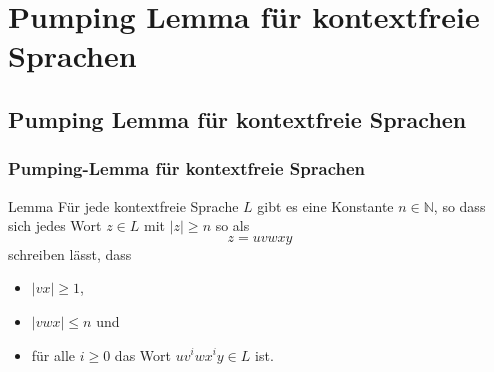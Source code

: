 \section{Pumping Lemma für kontextfreie Sprachen}
\subsection{Pumping Lemma für kontextfreie Sprachen}
\begin{frame}
	\frametitle{Pumping-Lemma für kontextfreie Sprachen}
	\begin{exampleblock}{Lemma}
		Für jede kontextfreie Sprache $L$ gibt es eine Konstante $n \in \mathbb{N}$,
		so dass sich jedes Wort $z \in L$ mit $|z| \geq n$ so als
		$$ z = uvwxy $$
		schreiben lässt, dass
		\begin{itemize}
			\item $|vx| \geq 1$,
			\item $|vwx| \leq n$ und
			\item für alle $i \geq 0$ das Wort $uv^iwx^iy \in L$ ist.
		\end{itemize}
	\end{exampleblock}
\end{frame}

%


